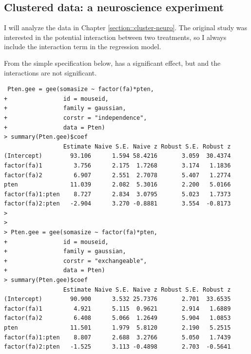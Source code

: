 \subsection{Clustered data: a neuroscience experiment} 


I will analyze the data in Chapter \ref{section::cluster-neuro}. 
The original study was interested in the potential interaction between two treatments, so I always include the interaction term in the regression model. 


From the simple specification below,  has a significant effect, but  and the interactions are not significant.
\begin{lstlisting}
 Pten.gee = gee(somasize ~ factor(fa)*pten, 
+                id = mouseid, 
+                family = gaussian, 
+                corstr = "independence",
+                data = Pten)
> summary(Pten.gee)$coef 
                 Estimate Naive S.E. Naive z Robust S.E. Robust z
(Intercept)        93.106      1.594 58.4216       3.059  30.4374
factor(fa)1         3.756      2.175  1.7268       3.174   1.1836
factor(fa)2         6.907      2.551  2.7078       5.407   1.2774
pten               11.039      2.082  5.3016       2.200   5.0166
factor(fa)1:pten    8.727      2.834  3.0795       5.023   1.7373
factor(fa)2:pten   -2.904      3.270 -0.8881       3.554  -0.8173
> 
> 
> Pten.gee = gee(somasize ~ factor(fa)*pten, 
+                id = mouseid, 
+                family = gaussian, 
+                corstr = "exchangeable",
+                data = Pten)
> summary(Pten.gee)$coef
                 Estimate Naive S.E. Naive z Robust S.E. Robust z
(Intercept)        90.900      3.532 25.7376       2.701  33.6535
factor(fa)1         4.921      5.115  0.9621       2.914   1.6889
factor(fa)2         6.408      5.066  1.2649       5.904   1.0853
pten               11.501      1.979  5.8120       2.190   5.2515
factor(fa)1:pten    8.807      2.688  3.2766       5.050   1.7439
factor(fa)2:pten   -1.525      3.113 -0.4898       2.703  -0.5641
\end{lstlisting}
 
 
 
